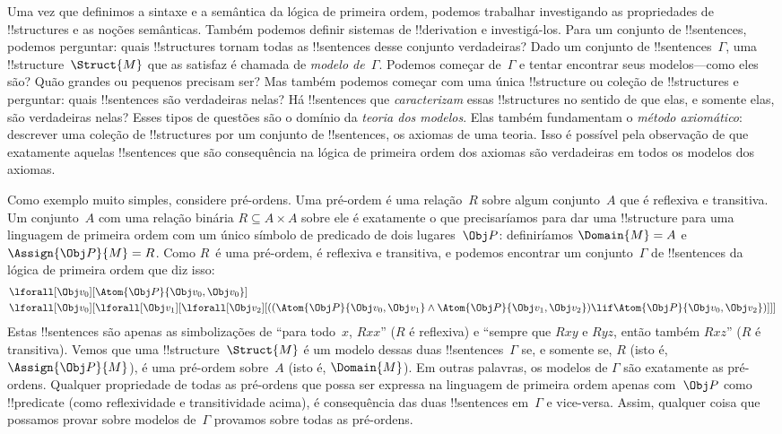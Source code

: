 \documentclass[../../../include/open-logic-section]{subfiles}
\begin{document}


Uma vez que definimos a sintaxe e a semântica da lógica de primeira
ordem, podemos trabalhar investigando as propriedades de
!!{structure}s e as noções semânticas. Também podemos definir sistemas
de !!{derivation} e investigá-los.  Para um conjunto de
!!{sentence}s, podemos perguntar: quais !!{structure}s tornam todas as
!!{sentence}s desse conjunto verdadeiras?  Dado um conjunto de
!!{sentence}s~$\Gamma$, uma !!{structure}~$\Struct{M}$ que as satisfaz
é chamada de \emph{modelo de~$\Gamma$}.  Podemos começar
de~$\Gamma$ e tentar encontrar seus modelos---como eles são? Quão
grandes ou pequenos precisam ser? Mas também podemos começar com uma
única !!{structure} ou coleção de !!{structure}s e perguntar: quais
!!{sentence}s são verdadeiras nelas?  Há !!{sentence}s que
\emph{caracterizam} essas !!{structure}s no sentido de que elas, e
somente elas, são verdadeiras nelas? Esses tipos de questões são o
domínio da \emph{teoria dos modelos}.  Elas também fundamentam o
\emph{método axiomático}: descrever uma coleção de !!{structure}s por
um conjunto de !!{sentence}s, os axiomas de uma teoria. Isso é possível
pela observação de que exatamente aquelas !!{sentence}s que são consequência
na lógica de primeira ordem dos axiomas são verdadeiras em todos os
modelos dos axiomas.

Como exemplo muito simples, considere pré-ordens. Uma pré-ordem é uma
relação~$R$ sobre algum conjunto~$A$ que é reflexiva e transitiva.
Um conjunto~$A$ com uma relação binária $R \subseteq A \times A$ sobre
ele é exatamente o que precisaríamos para dar uma !!{structure} para uma
linguagem de primeira ordem com um único símbolo de predicado de dois
lugares~$\Obj P$: definiríamos $\Domain{M} = A$ e $\Assign{\Obj P}{M} =
R$.  Como $R$~é uma pré-ordem, é reflexiva e transitiva, e podemos
encontrar um conjunto~$\Gamma$ de !!{sentence}s da lógica de primeira
ordem que diz isso:
\begin{align*}
  & \lforall[\Obj v_0][\Atom{\Obj P}{\Obj v_0,\Obj v_0}]\\
  & \lforall[\Obj v_0][\lforall[\Obj v_1][\lforall[\Obj v_2][((\Atom{\Obj P}{\Obj v_0,\Obj v_1} \land \Atom{\Obj P}{\Obj v_1,\Obj v_2}) \lif \Atom{\Obj P}{\Obj v_0,\Obj v_2})]]]
\end{align*}
Estas !!{sentence}s são apenas as simbolizações de ``para todo~$x$,
$Rxx$'' ($R$ é reflexiva) e ``sempre que $Rxy$ e $Ryz$, então também
$Rxz$'' ($R$ é transitiva). Vemos que uma !!{structure}~$\Struct{M}$
é um modelo dessas duas !!{sentence}s~$\Gamma$ se, e somente se, $R$
(isto é, $\Assign{\Obj P}{M}$), é uma pré-ordem sobre~$A$ (isto é,
$\Domain{M}$). Em outras palavras, os modelos de $\Gamma$ são
exatamente as pré-ordens. Qualquer propriedade de todas as pré-ordens
que possa ser expressa na linguagem de primeira ordem apenas com~$\Obj P$
como !!{predicate} (como reflexividade e transitividade acima), é
consequência das duas !!{sentence}s em~$\Gamma$ e vice-versa.  Assim,
qualquer coisa que possamos provar sobre modelos de~$\Gamma$ provamos
sobre todas as pré-ordens.
\end{document}
